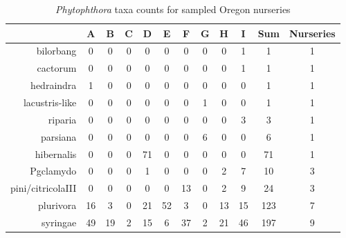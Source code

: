 \documentclass[12pt]{article}
\begin{document}
\begin{table}[ht]
\caption{\emph{Phytophthora} taxa counts for sampled Oregon nurseries}
\centering
\begin{tabular}{rccccccccccc}
  \hline
 & A & B & C & D & E & F & G & H & I & Sum & Nurseries \\
  \hline
bilorbang & 0 & 0 & 0 & 0 & 0 & 0 & 0 & 0 & 1 & 1 & 1 \\
  cactorum & 0 & 0 & 0 & 0 & 0 & 0 & 0 & 0 & 1 & 1 & 1 \\
  hedraindra  & 1 & 0 & 0 & 0 & 0 & 0 & 0 & 0 & 0 & 1 & 1 \\
  lacustris-like & 0 & 0 & 0 & 0 & 0 & 0 & 1 & 0 & 0 & 1 & 1 \\
  riparia & 0 & 0 & 0 & 0 & 0 & 0 & 0 & 0 & 3 & 3 & 1 \\
  parsiana & 0 & 0 & 0 & 0 & 0 & 0 & 6 & 0 & 0 & 6 & 1 \\
  hibernalis & 0 & 0 & 0 & 71 & 0 & 0 & 0 & 0 & 0 & 71 & 1 \\
  Pgclamydo & 0 & 0 & 0 & 1 & 0 & 0 & 0 & 2 & 7 & 10 & 3 \\
  pini/citricolaIII & 0 & 0 & 0 & 0 & 0 & 13 & 0 & 2 & 9 & 24 & 3 \\
  plurivora & 16 & 3 & 0 & 21 & 52 & 3 & 0 & 13 & 15 & 123 & 7 \\
  syringae & 49 & 19 & 2 & 15 & 6 & 37 & 2 & 21 & 46 & 197 & 9 \\
   \hline
\end{tabular}
\label{tab:taxa_counts}
\end{table}
\end{document}
